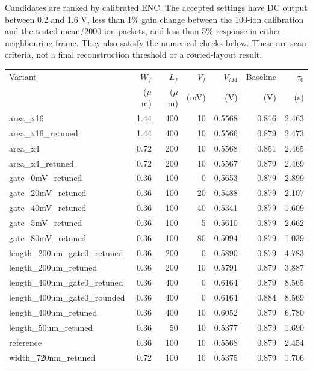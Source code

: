 \documentclass[11pt,a4paper]{article}
\begin{document}
Candidates are ranked by calibrated ENC. The accepted settings have DC output
between 0.2 and 1.6 V, less than 1\% gain change between the 100-ion calibration
and the tested mean/2000-ion packets, and less than 5\% response in either
neighbouring frame. They also satisfy the numerical checks below. These are
scan criteria, not a final reconstruction threshold or a routed-layout result.

\small
\begin{longtable}{lrrrrrr}
\toprule
Variant & $W_f$ & $L_f$ & $V_f$ & $V_{M4}$ & Baseline & $\tau_0$\\
 & ($\mu$m) & ($\mu$m) & (mV) & (V) & (V) & (s)\\\midrule\endhead
area\_x16 & 1.44 & 400 & 10 & 0.5568 & 0.816 & 2.463 \\
area\_x16\_retuned & 1.44 & 400 & 10 & 0.5566 & 0.879 & 2.473 \\
area\_x4 & 0.72 & 200 & 10 & 0.5568 & 0.851 & 2.465 \\
area\_x4\_retuned & 0.72 & 200 & 10 & 0.5567 & 0.879 & 2.469 \\
gate\_0mV\_retuned & 0.36 & 100 & 0 & 0.5653 & 0.879 & 2.899 \\
gate\_20mV\_retuned & 0.36 & 100 & 20 & 0.5488 & 0.879 & 2.107 \\
gate\_40mV\_retuned & 0.36 & 100 & 40 & 0.5341 & 0.879 & 1.609 \\
gate\_5mV\_retuned & 0.36 & 100 & 5 & 0.5610 & 0.879 & 2.662 \\
gate\_80mV\_retuned & 0.36 & 100 & 80 & 0.5094 & 0.879 & 1.039 \\
length\_200um\_gate0\_retuned & 0.36 & 200 & 0 & 0.5890 & 0.879 & 4.783 \\
length\_200um\_retuned & 0.36 & 200 & 10 & 0.5791 & 0.879 & 3.887 \\
length\_400um\_gate0\_retuned & 0.36 & 400 & 0 & 0.6164 & 0.879 & 8.565 \\
length\_400um\_gate0\_rounded & 0.36 & 400 & 0 & 0.6164 & 0.884 & 8.569 \\
length\_400um\_retuned & 0.36 & 400 & 10 & 0.6052 & 0.879 & 6.780 \\
length\_50um\_retuned & 0.36 & 50 & 10 & 0.5377 & 0.879 & 1.690 \\
reference & 0.36 & 100 & 10 & 0.5568 & 0.879 & 2.454 \\
width\_720nm\_retuned & 0.72 & 100 & 10 & 0.5375 & 0.879 & 1.706 \\
\bottomrule\end{longtable}
\end{document}
